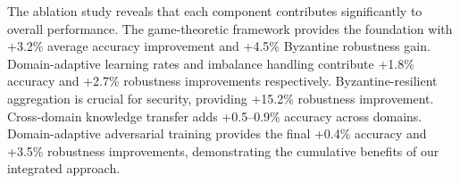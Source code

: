 \documentclass[12pt,a4paper]{article}
\theoremstyle{definition}
\begin{document}
\begin{table}[H]
\centering
\caption{Ablation Study: Component Contribution Analysis (\%)}
\label{tab:ablation_study}
\begingroup
\setlength{\tabcolsep}{4pt}
\renewcommand{\arraystretch}{1.05}
\endgroup
\end{table}

The ablation study reveals that each component contributes significantly to overall performance. The game-theoretic framework provides the foundation with +3.2\% average accuracy improvement and +4.5\% Byzantine robustness gain. Domain-adaptive learning rates and imbalance handling contribute +1.8\% accuracy and +2.7\% robustness improvements respectively. Byzantine-resilient aggregation is crucial for security, providing +15.2\% robustness improvement. Cross-domain knowledge transfer adds +0.5--0.9\% accuracy across domains. Domain-adaptive adversarial training provides the final +0.4\% accuracy and +3.5\% robustness improvements, demonstrating the cumulative benefits of our integrated approach.
\end{document}

